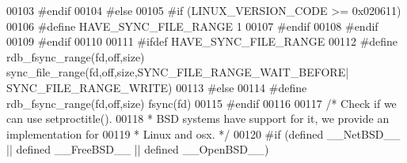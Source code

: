 \begin{DoxyCode}
00103 \textcolor{preprocessor}{#}\textcolor{preprocessor}{endif}
00104 \textcolor{preprocessor}{#}\textcolor{preprocessor}{else}
00105 \textcolor{preprocessor}{#}\textcolor{preprocessor}{if} \textcolor{preprocessor}{(}\textcolor{preprocessor}{LINUX\_VERSION\_CODE} \textcolor{preprocessor}{>=} 0x020611\textcolor{preprocessor}{)}
00106 \textcolor{preprocessor}{#}\textcolor{preprocessor}{define} \textcolor{preprocessor}{HAVE\_SYNC\_FILE\_RANGE} 1
00107 \textcolor{preprocessor}{#}\textcolor{preprocessor}{endif}
00108 \textcolor{preprocessor}{#}\textcolor{preprocessor}{endif}
00109 \textcolor{preprocessor}{#}\textcolor{preprocessor}{endif}
00110 
00111 \textcolor{preprocessor}{#}\textcolor{preprocessor}{ifdef} HAVE\_SYNC\_FILE\_RANGE
00112 \textcolor{preprocessor}{#}\textcolor{preprocessor}{define} \textcolor{preprocessor}{rdb\_fsync\_range}\textcolor{preprocessor}{(}\textcolor{preprocessor}{fd}\textcolor{preprocessor}{,}\textcolor{preprocessor}{off}\textcolor{preprocessor}{,}\textcolor{preprocessor}{size}\textcolor{preprocessor}{)} \textcolor{preprocessor}{sync\_file\_range}\textcolor{preprocessor}{(}\textcolor{preprocessor}{fd}\textcolor{preprocessor}{,}\textcolor{preprocessor}{off}\textcolor{preprocessor}{,}\textcolor{preprocessor}{size}\textcolor{preprocessor}{,}\textcolor{preprocessor}{SYNC\_FILE\_RANGE\_WAIT\_BEFORE}\textcolor{preprocessor}{|}\textcolor{preprocessor}{
      SYNC\_FILE\_RANGE\_WRITE}\textcolor{preprocessor}{)}
00113 \textcolor{preprocessor}{#}\textcolor{preprocessor}{else}
00114 \textcolor{preprocessor}{#}\textcolor{preprocessor}{define} \textcolor{preprocessor}{rdb\_fsync\_range}\textcolor{preprocessor}{(}\textcolor{preprocessor}{fd}\textcolor{preprocessor}{,}\textcolor{preprocessor}{off}\textcolor{preprocessor}{,}\textcolor{preprocessor}{size}\textcolor{preprocessor}{)} \textcolor{preprocessor}{fsync}\textcolor{preprocessor}{(}\textcolor{preprocessor}{fd}\textcolor{preprocessor}{)}
00115 \textcolor{preprocessor}{#}\textcolor{preprocessor}{endif}
00116 
00117 \textcolor{comment}{/* Check if we can use setproctitle().}
00118 \textcolor{comment}{ * BSD systems have support for it, we provide an implementation for}
00119 \textcolor{comment}{ * Linux and osx. */}
00120 \textcolor{preprocessor}{#}\textcolor{preprocessor}{if} \textcolor{preprocessor}{(}\textcolor{preprocessor}{defined} \textcolor{preprocessor}{\_\_NetBSD\_\_} \textcolor{preprocessor}{||} \textcolor{preprocessor}{defined} \textcolor{preprocessor}{\_\_FreeBSD\_\_} \textcolor{preprocessor}{||} \textcolor{preprocessor}{defined} \textcolor{preprocessor}{\_\_OpenBSD\_\_}\textcolor{preprocessor}{)}

\end{DoxyCode}
